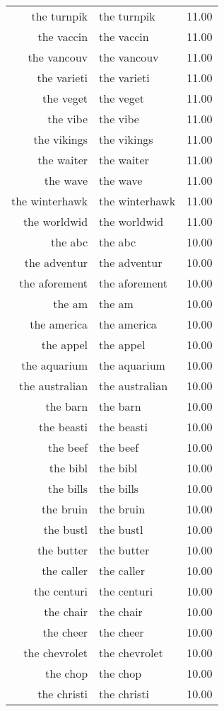 \begin{table}[ht]
\begin{tabular}{rlr}
  the turnpik & the turnpik & 11.00 \\ 
  the vaccin & the vaccin & 11.00 \\ 
  the vancouv & the vancouv & 11.00 \\ 
  the varieti & the varieti & 11.00 \\ 
  the veget & the veget & 11.00 \\ 
  the vibe & the vibe & 11.00 \\ 
  the vikings & the vikings & 11.00 \\ 
  the waiter & the waiter & 11.00 \\ 
  the wave & the wave & 11.00 \\ 
  the winterhawk & the winterhawk & 11.00 \\ 
  the worldwid & the worldwid & 11.00 \\ 
  the abc & the abc & 10.00 \\ 
  the adventur & the adventur & 10.00 \\ 
  the aforement & the aforement & 10.00 \\ 
  the am & the am & 10.00 \\ 
  the america & the america & 10.00 \\ 
  the appel & the appel & 10.00 \\ 
  the aquarium & the aquarium & 10.00 \\ 
  the australian & the australian & 10.00 \\ 
  the barn & the barn & 10.00 \\ 
  the beasti & the beasti & 10.00 \\ 
  the beef & the beef & 10.00 \\ 
  the bibl & the bibl & 10.00 \\ 
  the bills & the bills & 10.00 \\ 
  the bruin & the bruin & 10.00 \\ 
  the bustl & the bustl & 10.00 \\ 
  the butter & the butter & 10.00 \\ 
  the caller & the caller & 10.00 \\ 
  the centuri & the centuri & 10.00 \\ 
  the chair & the chair & 10.00 \\ 
  the cheer & the cheer & 10.00 \\ 
  the chevrolet & the chevrolet & 10.00 \\ 
  the chop & the chop & 10.00 \\ 
  the christi & the christi & 10.00 \\ 

\end{tabular}
\end{table}

